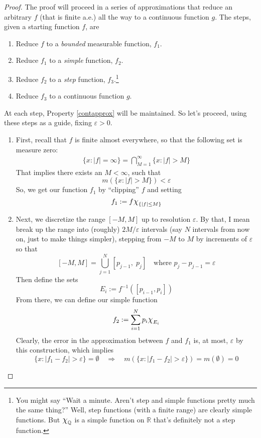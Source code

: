 \documentclass[12pt]{article}
\theoremstyle{plain}
\theoremstyle{definition}
\theoremstyle{remark}
\newcommand*{\Chi}{\mbox{\large$\chi$}} %
\begin{document}
\begin{proof}
The proof will proceed in a series of approximations that reduce an arbitrary $f$ (that is finite a.e.) all the way to a continuous function $g$. The steps, given a starting function $f$, are 
\begin{enumerate}
    \item Reduce $f$ to a \emph{bounded} measurable function, $f_1$.
    \item Reduce $f_1$ to a \emph{simple} function, $f_2$.
    \item Reduce $f_2$ to a \emph{step} function, $f_3$.\footnote{You might say ``Wait a minute. Aren't step and simple functions pretty much the same thing?'' Well, step functions (with a finite range) are clearly simple functions. But $\Chi_{\mathbb{Q}}$ is a simple function on $\mathbb{R}$ that's definitely not a step function.}
    \item Reduce $f_3$ to a continuous function $g$.
\end{enumerate}
At each step, Property \ref{contapprox} will be maintained. So let's proceed, using these steps as a guide, fixing $\varepsilon>0$.

\begin{enumerate}

\item First, recall that $f$ is finite almost everywhere, so that the following set is measure zero: 
\begin{align*}
    \{x: |f| = \infty\} =  \bigcap_{M=1}^\infty 
    \{x: |f| > M\}
\end{align*}
That implies there exists an $M<\infty$, such that 
\[
    m(\{x: |f| > M\}) <\varepsilon
\]
So, we get our function $f_1$ by ``clipping'' $f$ and setting
\[
    f_1 := f\Chi_{\{|f|\leq M\}}
\]

\item Next, we discretize the range $[-M,M]$ up to resolution $\varepsilon$. By that, I mean break up the range into (roughly) $2M/\varepsilon$ intervals (say $N$ intervals from now on, just to make things simpler), stepping from $-M$ to $M$ by increments of $\varepsilon$ so that
\[
    [-M,M] = \bigcup_{j=1}^{N}
    [p_{j-1},\;p_{j}]
    \quad \text{where $p_j-p_{j-1}=\varepsilon$}
\]
Then define the sets
\[
    E_i := f^{-1}([p_{i-1},p_i])
\]
From there, we can define our simple function
\[
    f_2:=\sum^{N}_{i=1} p_i \Chi_{E_i}
\]
Clearly, the error in the approximation between $f$ and $f_1$ is, at most, $\varepsilon$ by this construction, which implies
\[
    \{x: |f_1-f_2|>\varepsilon\} = \emptyset
    \quad\Rightarrow\quad 
    m(\{x: |f_1-f_2|>\varepsilon\}) = m(\emptyset)=0
\]


\end{enumerate}
\end{proof}
\end{document}
